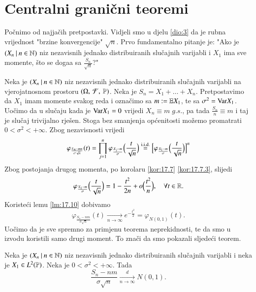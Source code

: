 
\chapter{Centralni grani\v cni teoremi}

Po\v cnimo od najja\v cih pretpostavki.
Vidjeli smo u djelu \ref{dio:3} da je rubna vrijednost "brzine konvergencije" $\sqrt{n}$.
Prvo fundamentalno pitanje je: "Ako je $({X_n} \: | \: {n \in \mathbb{N}})$ niz nezavisnih jednako distribuiranih slu\v cajnih varijabli i $X_1$ ima sve momente, \v sto se doga\dj a sa $\frac{S_n}{\sqrt{n}}$?"

Neka je $({X_n} \: | \: {n \in \mathbb{N}})$ niz nezavisnih jednako distribuiranih slu\v cajnih varijabli na vjerojatnosnom prostoru $(\Omega, \: \mathcal{F}, \: \mathbb{P})$.
Neka je $S_n = X_1 + \ldots + X_n$.
Pretpostavimo da $X_1$ imam momente svakog reda i ozna\v cimo sa $m:= \mathbb{E} X_1$, te sa $\sigma^2 = \mathrm{Var} X_1$.
Uo\v cimo da u slu\v caju kada je $\mathrm{Var} X_1 = 0$ vrijedi $X_n \equiv m \; g.s.$, pa tada $\frac{S_n}{n} \equiv m$ i taj je slu\v caj trivijalno rje\v sen.
Stoga bez smanjenja op\' cenitosti mo\v zemo promatrati $0 < \sigma^2 < +\infty$.
Zbog nezavisnosti vrijedi
\begin{equation*}
    \varphi_{\frac{S_n - m n}{\sigma \sqrt{n}}} (t) = \prod\limits_{j = 1}^{n} \varphi_{\frac{X_j - m}{\sigma}} \Big( \frac{t}{\sqrt{n}} \Big) \overset{\mathrm{i.i.d.}}{=} \Big[ \varphi_{\frac{X_1 - m}{\sigma}} \Big( \frac{t}{\sqrt{n}} \Big) \Big]^n
\end{equation*}
Zbog postojanja drugog momenta, po korolaru \ref{kor:17.7} \ref{kor:17.7.3}, slijedi
\begin{equation*}
    \varphi_{\frac{X_1 - m}{\sigma}} \Big( \frac{t}{\sqrt{n}} \Big) = 1 - \frac{t^2}{2 n} + o \Big( \frac{t^2}{n} \Big), \quad \forall t \in \mathbb{R}.
\end{equation*}
Koriste\' ci lemu \ref{lm:17.10} dobivamo
\begin{equation*}
    \varphi_{\frac{S_n - n m}{\sigma \sqrt{n}}} (t) \xrightarrow[n \to \infty]{} e^{-\frac{t^2}{2}} = \varphi_{N(0,1)} (t).
\end{equation*}
Uo\v cimo da je sve spremno za primjenu teorema neprekidnosti, te da smo u izvodu koristili samo drugi moment.
To zna\v ci da smo pokazali sljede\' ci teorem.

\begin{tm}  \label{tm:19.1}
    \quad \newline
    Neka je $({X_n} \: | \: {n \in \mathbb{N}})$ niz nezavisnih jednako distribuiranih slu\v cajnih varijabli i neka je $X_1 \in L^2 (\mathbb{P})$.
    Neka je $0 < \sigma^2 < +\infty$.
    Tada
    \begin{equation*}
        \frac{S_n - n m}{\sigma \sqrt{n}} \xrightarrow[n \to \infty]{d} N (0, 1).
    \end{equation*}    
\end{tm}

